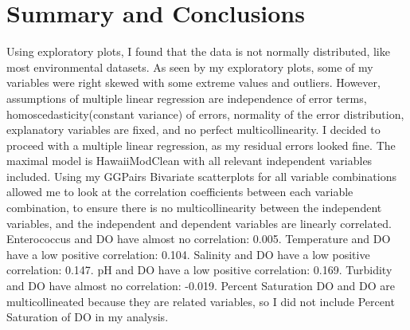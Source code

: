 \documentclass[12pt,]{article}
\begin{document}
\section{Summary and Conclusions}\label{summary-and-conclusions-1}

Using exploratory plots, I found that the data is not normally
distributed, like most environmental datasets. As seen by my exploratory
plots, some of my variables were right skewed with some extreme values
and outliers. However, assumptions of multiple linear regression are
independence of error terms, homoscedasticity(constant variance) of
errors, normality of the error distribution, explanatory variables are
fixed, and no perfect multicollinearity. I decided to proceed with a
multiple linear regression, as my residual errors looked fine. The
maximal model is HawaiiModClean with all relevant independent variables
included. Using my GGPairs Bivariate scatterplots for all variable
combinations allowed me to look at the correlation coefficients between
each variable combination, to ensure there is no multicollinearity
between the independent variables, and the independent and dependent
variables are linearly correlated. Enterococcus and DO have almost no
correlation: 0.005. Temperature and DO have a low positive correlation:
0.104. Salinity and DO have a low positive correlation: 0.147. pH and DO
have a low positive correlation: 0.169. Turbidity and DO have almost no
correlation: -0.019. Percent Saturation DO and DO are multicollineated
because they are related variables, so I did not include Percent
Saturation of DO in my analysis.
\end{document}

